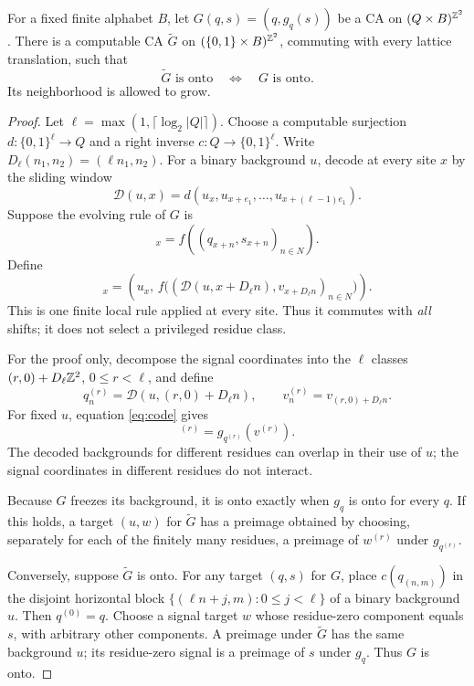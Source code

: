 \begin{lemma}\label{lem:code}
For a fixed finite alphabet \(B\), let \(G(q,s)=(q,g_q(s))\) be a CA on \((Q\times B)^{\mathbb Z^2}\). There is a computable CA \(\widetilde G\) on \((\{0,1\}\times B)^{\mathbb Z^2}\), commuting with every lattice translation, such that
\begin{equation}
 \widetilde G\text{ is onto}\quad\Longleftrightarrow\quad G\text{ is onto}.
\end{equation}
Its neighborhood is allowed to grow.
\end{lemma}
\begin{proof}
Let \(\ell=\max(1,\lceil\log_2|Q|\rceil)\). Choose a computable surjection
\(d:\{0,1\}^{\ell}\to Q\) and a right inverse \(c:Q\to\{0,1\}^{\ell}\).
Write \(D_\ell(n_1,n_2)=(\ell n_1,n_2)\). For a binary background \(u\), decode at every site \(x\) by the sliding window
\begin{equation}
 \mathcal D(u,x)=d(u_x,u_{x+e_1},\ldots,u_{x+(\ell-1)e_1}).
\end{equation}
Suppose the evolving rule of \(G\) is
\begin{equation}
 [g_q(s)]_x=f((q_{x+n},s_{x+n})_{n\in N}).
\end{equation}
Define
\begin{equation}
 [\widetilde G(u,v)]_x=
 \left(u_x,\,
 f\bigl((\mathcal D(u,x+D_\ell n),v_{x+D_\ell n})_{n\in N}\bigr)\right).
 \label{eq:code}
\end{equation}
This is one finite local rule applied at every site. Thus it commutes with \emph{all} shifts; it does not select a privileged residue class.

For the proof only, decompose the signal coordinates into the \(\ell\) classes
\((r,0)+D_\ell\mathbb Z^2\), \(0\le r<\ell\), and define
\begin{equation}
 q_n^{(r)}=\mathcal D(u,(r,0)+D_\ell n),\qquad
 v_n^{(r)}=v_{(r,0)+D_\ell n}.
\end{equation}
For fixed \(u\), equation \eqref{eq:code} gives
\begin{equation}
 [\widetilde G_u(v)]^{(r)}=g_{q^{(r)}}(v^{(r)}).
\end{equation}
The decoded backgrounds for different residues can overlap in their use of \(u\); the signal coordinates in different residues do not interact.

Because \(G\) freezes its background, it is onto exactly when \(g_q\) is onto for every \(q\). If this holds, a target \((u,w)\) for \(\widetilde G\) has a preimage obtained by choosing, separately for each of the finitely many residues, a preimage of \(w^{(r)}\) under \(g_{q^{(r)}}\).

Conversely, suppose \(\widetilde G\) is onto. For any target \((q,s)\) for \(G\), place \(c(q_{(n,m)})\) in the disjoint horizontal block
\(\{(\ell n+j,m):0\le j<\ell\}\) of a binary background \(u\). Then \(q^{(0)}=q\). Choose a signal target \(w\) whose residue-zero component equals \(s\), with arbitrary other components. A preimage under \(\widetilde G\) has the same background \(u\); its residue-zero signal is a preimage of \(s\) under \(g_q\). Thus \(G\) is onto.
\end{proof}

